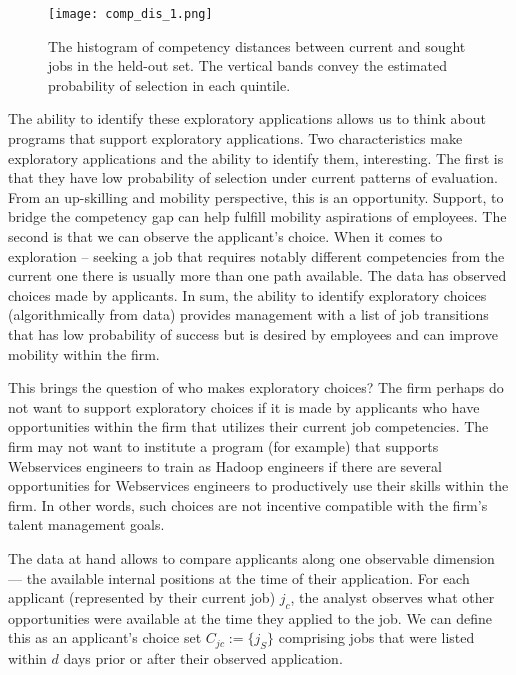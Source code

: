 \documentclass{article}
\begin{document}
\begin{figure}[!ht]
    \centering
    \texttt{[image: comp\_dis\_1.png]} %
    \caption{The histogram of competency distances between current and sought jobs in the held-out set. The vertical bands convey the estimated probability of selection in each quintile.} %
    \label{fig:app1} 
\end{figure}


The ability to identify these exploratory applications allows us to think about programs that support exploratory applications. Two characteristics make exploratory applications and the ability to identify them, interesting. The first is that they have low probability of selection under current patterns of evaluation. From an up-skilling and mobility perspective, this is an opportunity. Support, to bridge the competency gap can help fulfill mobility aspirations of employees. The second is that we can observe the applicant’s choice. When it comes to exploration -- seeking a job that requires notably different competencies from the current one there is usually more than one path available. The data has observed choices made by applicants. In sum, the ability to identify exploratory choices (algorithmically from data) provides management with a list of job transitions that has low probability of success but is desired by employees and can improve mobility within the firm. 

This brings the question of who makes exploratory choices? The firm perhaps do not want to support exploratory choices if it is made by applicants who have opportunities within the firm that utilizes their current job competencies. The firm may not want to institute a program (for example) that supports Webservices engineers to train as Hadoop engineers if there are several opportunities for Webservices engineers to productively use their skills within the firm. In other words, such choices are not incentive compatible with the firm’s talent management goals. 


The data at hand allows to compare applicants along one observable dimension --- the available internal positions at the time of their application. For each applicant (represented by their current job) \(j_c\), the analyst observes what other opportunities were available at the time they applied to the job. We can define this as an applicant’s choice set \(C_{jc} := \{j_S\}\) comprising jobs that were listed within \(d\) days prior or after their observed application.
\end{document}
